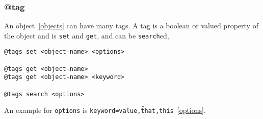 \subsubsection{@tag}
\label{tag}

An object~\ref{objects} can have many tags. A tag is a boolean or valued property of the object and is \texttt{set} and \texttt{get}, and can be \texttt{search}ed,
%
\begin{verbatim}
@tags set <object-name> <options>

@tags get <object-name>
@tags get <object-name> <keyword>

@tags search <options>
\end{verbatim}
%
An example for \texttt{options} is \texttt{keyword=value,\~that,this}~\ref{options}.